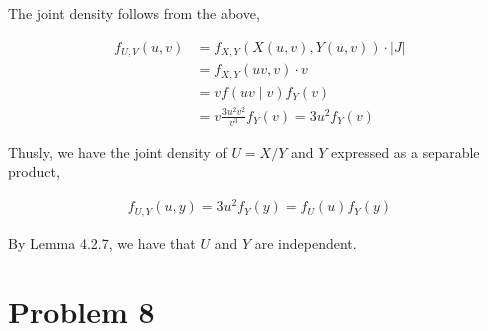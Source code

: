 \documentclass[11pt]{article}
\begin{document}
The joint density follows from the above,

\begin{align*}
  f_{U,V} (u,v) &= f_{X,Y}(X(u,v), Y(u,v)) \cdot \left| J \right| \\
  &= f_{X,Y}(uv, v) \cdot v \\
  &= v f(uv \mid v) f_Y(v) \\
  &= v \frac{3u^2v^2}{v^3} f_Y(v) = 3u^2 f_Y(v)
\end{align*}

Thusly, we have the joint density of $U = X/Y$ and $Y$ expressed as a
separable product,

\begin{align*}
  f_{U,Y}(u,y) = 3u^2 f_Y(y) = f_U(u) f_Y(y)
\end{align*}

By Lemma 4.2.7, we have that $U$ and $Y$ are independent.

\section*{Problem 8}
\end{document}
